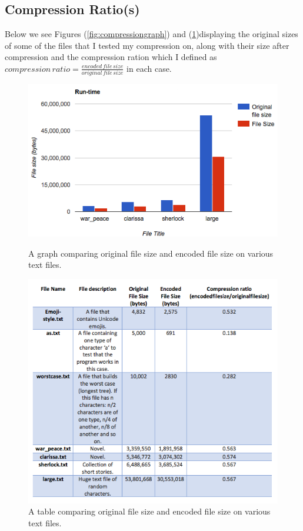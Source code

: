 \documentclass{mm2}
\begin{document}
\subsection{Compression Ratio(s)}
Below we see Figures (\ref{fig:compressiongraph}) and (\ref{fig:compressiontable})displaying the original sizes of some of the files that I tested my compression on, along with their size after compression and the compression ration which I defined as $compression \, ratio = \frac{encoded \, file \, size}{original \, file \, size}$ in each case.
\begin{figure}[ht]
  \includegraphics[width=\linewidth]{figures/compressiongraph.png}
  \caption{A graph comparing original file size and encoded file size on various text files.}\label{fig:compressiongraph}
\endminipage\hfill
{}%
  \includegraphics[width=\linewidth]{figures/compressiontable.png}
  \caption{A table comparing original file size and encoded file size on various text files.}\label{fig:compressiontable}
\endminipage
\end{figure}
\end{document}
